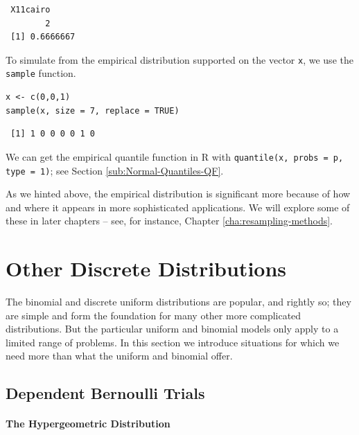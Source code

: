 \documentclass[captions=tableheading]{scrbook}
\begin{document}
\begin{verbatim}
 X11cairo 
        2
 [1] 0.6666667
\end{verbatim}

To simulate from the empirical distribution supported on the vector \texttt{x}, we use the \texttt{sample} function.


\begin{verbatim}
x <- c(0,0,1)
sample(x, size = 7, replace = TRUE)
\end{verbatim}

\begin{verbatim}
 [1] 1 0 0 0 0 1 0
\end{verbatim}

We can get the empirical quantile function in \textsf{R} with \texttt{quantile(x, probs = p, type = 1)}; see Section \ref{sub:Normal-Quantiles-QF}.

As we hinted above, the empirical distribution is significant more because of how and where it appears in more sophisticated applications. We will explore some of these in later chapters -- see, for instance, Chapter \ref{cha:resampling-methods}.
\section{Other Discrete Distributions}
\label{sec-5-6}

\label{sec:other-discrete-distributions}

The binomial and discrete uniform distributions are popular, and rightly so; they are simple and form the foundation for many other more complicated distributions. But the particular uniform and binomial models only apply to a limited range of problems. In this section we introduce situations for which we need more than what the uniform and binomial offer.
\subsection{Dependent Bernoulli Trials}
\label{sec-5-6-1}

\label{sec:non-bernoulli-trials}

\paragraph*{The Hypergeometric Distribution}
\label{sub:hypergeometric-dist}
\end{document}
